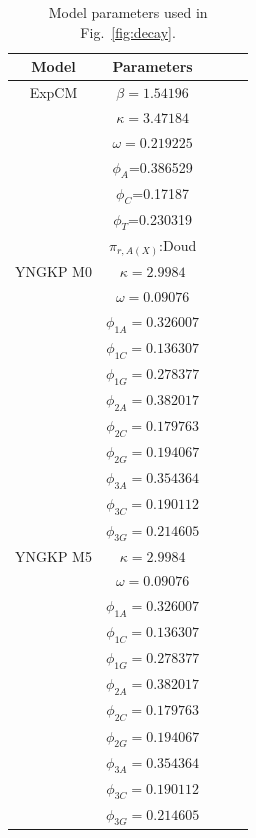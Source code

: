 \documentclass[11pt]{article}
\begin{document}
\begin{table}[t!]
\caption{\label{tab:wsn_low_params}
Model parameters used in  Fig.~\ref{fig:decay}.}
      \begin{tabular}{ccccc}
        \hline
          Model & Parameters\\ \hline
          ExpCM & $\beta=1.54196$\\
           & $\kappa=3.47184$\\
           & $\omega=0.219225$\\ 
           & $\phi_A$=0.386529\\ 
           & $\phi_C$=0.17187\\
           & $\phi_T$=0.230319\\
           & $\pi_{r, A\left(X\right)}$:Doud\\
          YNGKP M0 & $\kappa=2.9984$\\
          & $\omega=0.09076$\\
          & $\phi_{1A}=0.326007$\\
          & $\phi_{1C}=0.136307$\\ 
          &$\phi_{1G}=0.278377$\\
          &$\phi_{2A}=0.382017$\\ 
          &$\phi_{2C}=0.179763$\\ 
          &$\phi_{2G}=0.194067$\\
          &$\phi_{3A}=0.354364$\\
          &$\phi_{3C}=0.190112$\\
          &$\phi_{3G}=0.214605$\\
          YNGKP M5 & $\kappa=2.9984$\\
          & $\omega=0.09076$\\
          & $\phi_{1A}=0.326007$\\
          & $\phi_{1C}=0.136307$\\ 
          &$\phi_{1G}=0.278377$\\
          &$\phi_{2A}=0.382017$\\ 
          &$\phi_{2C}=0.179763$\\ 
          &$\phi_{2G}=0.194067$\\
          &$\phi_{3A}=0.354364$\\
          &$\phi_{3C}=0.190112$\\
          &$\phi_{3G}=0.214605$\\
      \end{tabular}
\end{table}
\end{document}
